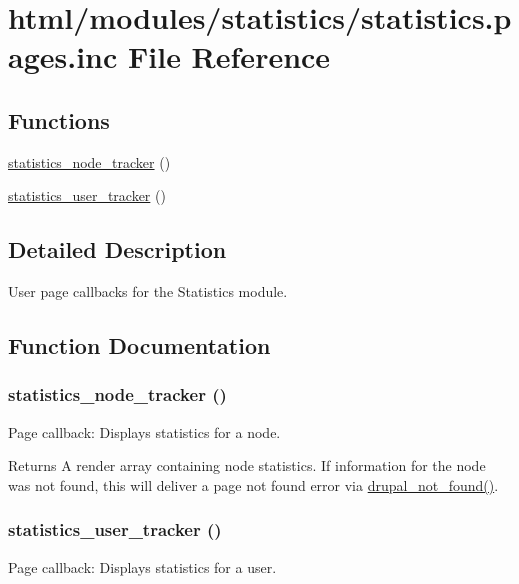\hypertarget{statistics_8pages_8inc}{
\section{html/modules/statistics/statistics.pages.inc File Reference}
\label{statistics_8pages_8inc}
}
\subsection*{Functions}
\begin{DoxyCompactItemize}
\item 
\hyperlink{statistics_8pages_8inc_ab371a704c4976518dc917c947b4ee4de}{statistics\_\-node\_\-tracker} ()
\item 
\hyperlink{statistics_8pages_8inc_a63b64d387a60a4698e520f2b5a75a271}{statistics\_\-user\_\-tracker} ()
\end{DoxyCompactItemize}


\subsection{Detailed Description}
User page callbacks for the Statistics module. 

\subsection{Function Documentation}
\hypertarget{statistics_8pages_8inc_ab371a704c4976518dc917c947b4ee4de}{
\subsubsection[{statistics\_\-node\_\-tracker}]{\setlength{\rightskip}{0pt plus 5cm}statistics\_\-node\_\-tracker ()}}
\label{statistics_8pages_8inc_ab371a704c4976518dc917c947b4ee4de}
Page callback: Displays statistics for a node.

\begin{DoxyReturn}{Returns}
A render array containing node statistics. If information for the node was not found, this will deliver a page not found error via \hyperlink{group__http__handling_ga52b08cd98e1756326c1bd5b56c39a884}{drupal\_\-not\_\-found()}. 
\end{DoxyReturn}
\hypertarget{statistics_8pages_8inc_a63b64d387a60a4698e520f2b5a75a271}{
\subsubsection[{statistics\_\-user\_\-tracker}]{\setlength{\rightskip}{0pt plus 5cm}statistics\_\-user\_\-tracker ()}}
\label{statistics_8pages_8inc_a63b64d387a60a4698e520f2b5a75a271}
Page callback: Displays statistics for a user.

